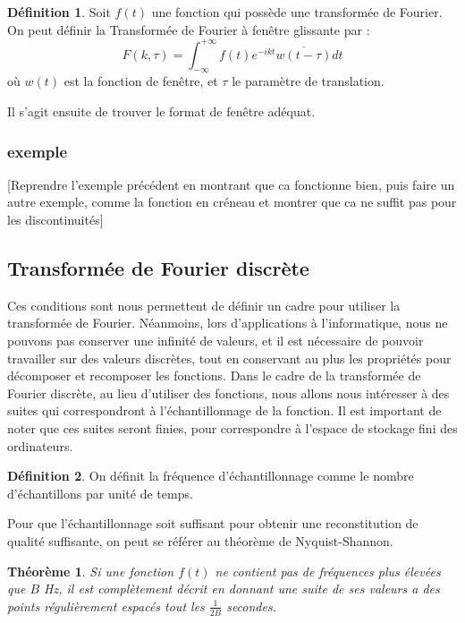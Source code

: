 \documentclass[]{article}
\newtheorem{mythm}{Théorème}
\theoremstyle{remark}
\theoremstyle{definition}
\newtheorem{mydef}{Définition}
\begin{document}
	\begin{mydef}
		Soit $f(t)$ une fonction qui possède une transformée de Fourier. On peut définir la Transformée de Fourier à fenêtre glissante par :
		$$ F(k, \tau)= \int_{-\infty}^{+\infty}f(t)e^{-ikt} \overline{w(t - \tau)}dt$$
		où $w(t)$ est la fonction de fenêtre, et $\tau$ le paramètre de translation. 
	\end{mydef}
	Il s'agit ensuite de trouver le format de fenêtre adéquat. 
	
	\subsubsection{exemple}
	[Reprendre l'exemple précédent en montrant que ca fonctionne bien, puis faire un autre exemple, comme la fonction en créneau et montrer que ca ne suffit pas pour les discontinuités]
	
	
	\subsection{Transformée de Fourier discrète}
			
	Ces conditions sont nous permettent de définir un cadre pour utiliser la transformée de Fourier. Néanmoins, lors d'applications à l'informatique, nous ne pouvons pas conserver une infinité de valeurs, et il est nécessaire de pouvoir travailler sur des valeurs discrètes, tout en conservant au plus les propriétés pour décomposer et recomposer les fonctions. 		
	Dans le cadre de la transformée de Fourier discrète, au lieu d'utiliser des fonctions, nous allons nous intéresser à des suites qui correspondront à l'échantillonnage de la fonction. Il est important de noter que ces suites seront finies, pour correspondre à l'espace de stockage fini des ordinateurs. 
	

	\begin{mydef}
		On définit la fréquence d'échantillonnage comme le nombre d'échantillons par unité de temps.  
	\end{mydef}
		Pour que l'échantillonnage soit suffisant pour obtenir une reconstitution de qualité suffisante, on peut se référer au théorème de Nyquist-Shannon. 
		
	\begin{mythm}
		Si une fonction $f(t)$ ne contient pas de fréquences plus élevées que $B$ Hz, il est complètement décrit en donnant une suite de ses valeurs a des points régulièrement espacés tout les $\frac{1}{2B}$ secondes.
	\end{mythm}
	
\end{document}
